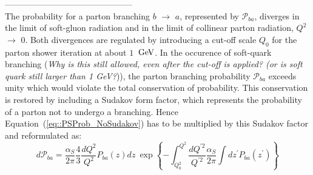 ---------------------------------------------\\

The probability for a parton branching $b$ $\rightarrow$ $a$, represented by $\mathcal{P}_{ba}$, diverges in the limit of soft-gluon radiation
and in the limit of collinear parton radiation, $Q^{2}$ $\rightarrow$ $0$.
Both divergences are regulated by introducing a cut-off scale $Q_{0}$ for the parton shower iteration at about $1$ $\, \mathrm{GeV}$. In the occurence of soft-quark branching (\textit{Why is this still allowed, even after the cut-off is applied? (or is soft quark still larger than 1 GeV?})), the parton branching probability $\mathcal{P}_{ba}$ exceeds unity which would violate the total conservation of probability. This conservation is restored by including a Sudakov form factor, which represents the probability of a parton not to undergo a branching. Hence Equation~(\ref{eq::PSProb_NoSudakov}) has to be multiplied by this Sudakov factor and reformulated as:
\begin{equation}
 d\mathcal{P}_{ba} = \dfrac{\alpha_{S}}{2\pi} \dfrac{4}{3} \dfrac{dQ^{2}}{Q^{2}} P_{ba}(z)dz ~ \exp \left\lbrace - \int_{Q_{0}^{2}}^{Q^{2}} \dfrac{dQ^{'2}}{Q^{'2}} \dfrac{\alpha_{S}}{2\pi} \int dz^{'} P_{ba}(z^{'})  \right\rbrace
\end{equation}

